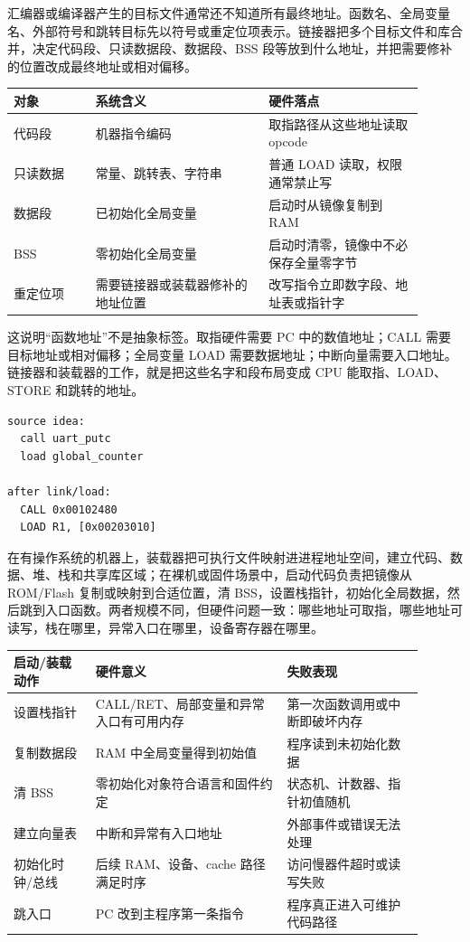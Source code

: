 汇编器或编译器产生的目标文件通常还不知道所有最终地址。函数名、全局变量名、外部符号和跳转目标先以符号或重定位项表示。链接器把多个目标文件和库合并，决定代码段、只读数据段、数据段、BSS 段等放到什么地址，并把需要修补的位置改成最终地址或相对偏移。

\begin{longtable}{L{0.18\linewidth}L{0.38\linewidth}L{0.34\linewidth}}
\toprule
对象 & 系统含义 & 硬件落点 \\
\midrule
代码段 & 机器指令编码 & 取指路径从这些地址读取 opcode \\
只读数据 & 常量、跳转表、字符串 & 普通 LOAD 读取，权限通常禁止写 \\
数据段 & 已初始化全局变量 & 启动时从镜像复制到 RAM \\
BSS & 零初始化全局变量 & 启动时清零，镜像中不必保存全量零字节 \\
重定位项 & 需要链接器或装载器修补的地址位置 & 改写指令立即数字段、地址表或指针字 \\
\bottomrule
\end{longtable}

这说明“函数地址”不是抽象标签。取指硬件需要 PC 中的数值地址；CALL 需要目标地址或相对偏移；全局变量 LOAD 需要数据地址；中断向量需要入口地址。链接器和装载器的工作，就是把这些名字和段布局变成 CPU 能取指、LOAD、STORE 和跳转的地址。

\begin{lstlisting}
source idea:
  call uart_putc
  load global_counter

after link/load:
  CALL 0x00102480
  LOAD R1, [0x00203010]
\end{lstlisting}

在有操作系统的机器上，装载器把可执行文件映射进进程地址空间，建立代码、数据、堆、栈和共享库区域；在裸机或固件场景中，启动代码负责把镜像从 ROM/Flash 复制或映射到合适位置，清 BSS，设置栈指针，初始化全局数据，然后跳到入口函数。两者规模不同，但硬件问题一致：哪些地址可取指，哪些地址可读写，栈在哪里，异常入口在哪里，设备寄存器在哪里。

\begin{longtable}{L{0.18\linewidth}L{0.42\linewidth}L{0.3\linewidth}}
\toprule
启动/装载动作 & 硬件意义 & 失败表现 \\
\midrule
设置栈指针 & CALL/RET、局部变量和异常入口有可用内存 & 第一次函数调用或中断即破坏内存 \\
复制数据段 & RAM 中全局变量得到初始值 & 程序读到未初始化数据 \\
清 BSS & 零初始化对象符合语言和固件约定 & 状态机、计数器、指针初值随机 \\
建立向量表 & 中断和异常有入口地址 & 外部事件或错误无法处理 \\
初始化时钟/总线 & 后续 RAM、设备、cache 路径满足时序 & 访问慢器件超时或读写失败 \\
跳入口 & PC 改到主程序第一条指令 & 程序真正进入可维护代码路径 \\
\bottomrule
\end{longtable}

